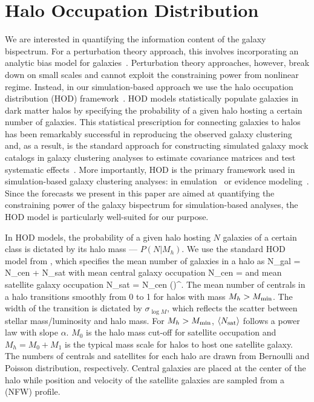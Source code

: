 \section{Halo Occupation Distribution} \label{sec:hod}  
We are interested in quantifying the information content of the galaxy bispectrum. 
For a perturbation theory approach, this involves incorporating an analytic bias model 
for galaxies~\citep[\emph{e.g.}][]{sefusatti2006, yankelevich2019, chudaykin2019}.
Perturbation theory approaches, however, break down on small scales and cannot
exploit the constraining power from nonlinear regime. Instead, in our simulation-based 
approach we use the halo occupation distribution (HOD) 
framework~\citep[\emph{e.g.}][]{benson2000, peacock2000, seljak2000, berlind2002,
cooray2002, zheng2005, leauthaud2012, tinker2013, zentner2016, vakili2019}.
HOD models statistically populate galaxies in dark matter halos by specifying
the probability of a given halo hosting a certain number of galaxies. This 
statistical prescription for connecting galaxies to halos has been remarkably 
successful in reproducing the observed galaxy clustering and, as a result, is the standard approach for constructing 
simulated galaxy mock catalogs in galaxy clustering analyses to estimate covariance 
matrices and test systematic effects~\citep[\emph{e.g.}][]{rodriguez-torres2016, rodriguez-torres2017, beutler2017}. 
More importantly, HOD is the primary framework used in simulation-based galaxy
clustering analyses: \eg in emulation~\citep{mcclintock2018,
zhai2019} or evidence modeling~\citep{lange2019}. Since the forecasts we
present in this paper are aimed at quantifying the constraining power of the
galaxy bispectrum for simulation-based analyses, the HOD model is particularly 
well-suited for our purpose.

In HOD models, the probability of a given halo hosting $N$ galaxies of a
certain class is dictated by its halo mass --- $P(N|M_h)$. We use the standard
HOD model from \cite{zheng2007}, which specifies the mean number of galaxies in
a halo as
\beq
\langle N_{\rm gal} \rangle = \langle N_{\rm cen} \rangle + \langle N_{\rm sat} \rangle
\eeq
with mean central galaxy occupation
\beq \label{eq:Ncen}
\langle N_{\rm cen} \rangle  = 
\eeq
and mean satellite galaxy occupation
\beq \label{eq:Nsat}
\langle N_{\rm sat} \rangle = \langle N_{\rm cen} \rangle \bigg(\bigg)^\alpha.
\eeq
The mean number of centrals in a halo transitions smoothly from 0 to 1 for halos 
with mass $M_h > M_{\rm min}$. The width of the transition is dictated by 
$\sigma_{\log M}$, which reflects the scatter between stellar mass/luminosity and 
halo mass. For $M_h > M_{\rm min}$, $\langle N_{\rm sat} \rangle$ follows a power 
law with slope $\alpha$. $M_0$ 
is the halo mass cut-off for satellite occupation and $M_h = M_0 + M_1$ is 
the typical mass scale for halos to host one satellite galaxy. The numbers 
of centrals and satellites for each halo are drawn from Bernoulli and Poisson 
distribution, respectively. Central galaxies are placed at the center of the
halo while position and velocity of the satellite galaxies are sampled from a 
\cite{navarro1997} (NFW) profile. 

